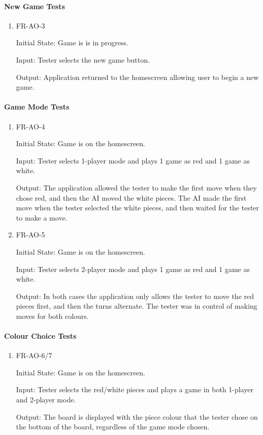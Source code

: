 \documentclass[12pt, titlepage]{article}
\begin{document}
\paragraph{New Game Tests}
\begin{enumerate}
    \item{FR-AO-3}
    \label{FR-AO-3}    
            
    Initial State: Game is is in progress.
    
    Input: Tester selects the new game button.
    
    Output: Application returned to the homescreen allowing user to begin a new game.
\end{enumerate}

\paragraph{Game Mode Tests}
\begin{enumerate}
    \item{FR-AO-4}
    \label{FR-AO-4}    
            
    Initial State: Game is on the homescreen.
    
    Input: Tester selects 1-player mode and plays 1 game as red and 1 game as white.
    
    Output: The application allowed the tester to make the first move when they chose red, and then the AI moved the white pieces. The AI made the first move when the tester selected the white pieces, and then waited for the tester to make a move. 
    \item{FR-AO-5}
    \label{FR-AO-5}    
               
    Initial State: Game is on the homescreen.
    
    Input: Tester selects 2-player mode and plays 1 game as red and 1 game as white.
    
    Output: In both cases the application only allows the tester to move the red pieces first, and then the turns alternate. The tester was in control of making moves for both colours.
\end{enumerate}

\paragraph{Colour Choice Tests}
\begin{enumerate}
    \item{FR-AO-6/7}
    \label{FR-AO-6/7}    
                
    Initial State: Game is on the homescreen.
    
    Input: Tester selects the red/white pieces and plays a game in both 1-player and 2-player mode.
    
    Output: The board is displayed with the piece colour that the tester chose on the bottom of the board, regardless of the game mode chosen.
\end{enumerate}
\end{document}
